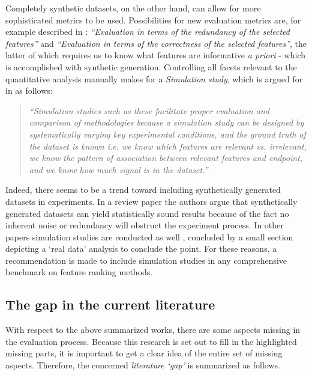 \documentclass[../main.tex]{subfiles}
\begin{document}
Completely synthetic datasets, on the other hand, can allow for more sophisticated metrics to be used. Possibilities for new evaluation metrics are, for example described in \citep{solorio-fernandez_review_2020}: \textit{``Evaluation in terms of the redundancy of the selected features''} and \textit{``Evaluation in terms of the correctness of the selected features''}, the latter of which requires us to know what features are informative \textit{a priori} - which is accomplished with synthetic generation. Controlling all facets relevant to the quantitative analysis manually makes for a \textit{Simulation study}, which is argued for in \citep{urbanowicz_benchmarking_2018} as follows:

\begin{quote}
    \textit{``Simulation studies such as these facilitate proper evaluation and comparison of methodologies because a simulation study can be designed by systematically varying key experimental conditions, and the ground truth of the dataset is known i.e. we know which features are relevant vs. irrelevant, we know the pattern of association between relevant features and endpoint, and we know how much signal is in the dataset.''}
\end{quote}

Indeed, there seems to be a trend toward including synthetically generated datasets in experiments. In a review paper \citep{bolon-canedo_review_2013} the authors argue that synthetically generated datasets can yield statistically sound results because of the fact no inherent noise or redundancy will obstruct the experiment process. In other papers simulation studies are conducted as well \citep{cai_online_2020} \citep{tang_high-dimensional_2020} \citep{li_distributed_2020}, concluded by a small section depicting a `real data' analysis to conclude the point. For these reasons, a recommendation is made to include simulation studies in any comprehensive benchmark on feature ranking methods.



\subsection{The gap in the current literature}
With respect to the above summarized works, there are some aspects missing in the evaluation process. Because this research is set out to fill in the highlighted missing parts, it is important to get a clear idea of the entire set of missing aspects. Therefore, the concerned \textit{literature `gap'} is summarized as follows.
\end{document}
